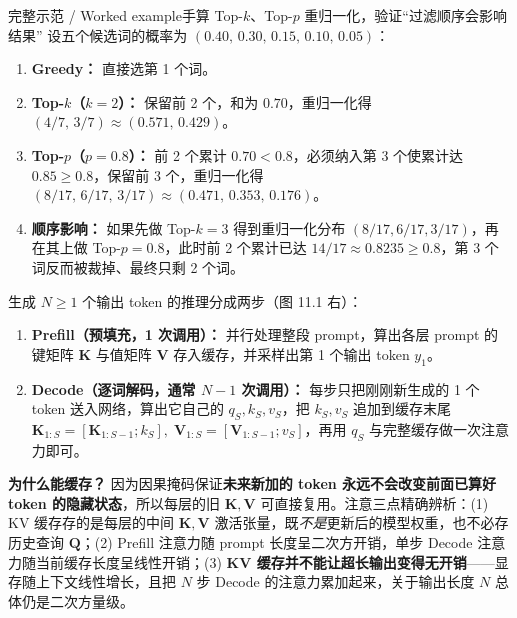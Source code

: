 \begin{StudyBlock}{完整示范 / Worked example}{手算 Top-$k$、Top-$p$ 重归一化，验证“过滤顺序会影响结果”}
设五个候选词的概率为 $(0.40,\, 0.30,\, 0.15,\, 0.10,\, 0.05)$：
\begin{enumerate}
\item \textbf{Greedy：} 直接选第 1 个词。
\item \textbf{Top-$k$（$k=2$）：} 保留前 2 个，和为 $0.70$，重归一化得 $(4/7,\, 3/7) \approx (0.571,\, 0.429)$。
\item \textbf{Top-$p$（$p=0.8$）：} 前 2 个累计 $0.70 < 0.8$，必须纳入第 3 个使累计达 $0.85 \ge 0.8$，保留前 3 个，重归一化得 $(8/17,\, 6/17,\, 3/17) \approx (0.471,\, 0.353,\, 0.176)$。
\item \textbf{顺序影响：} 如果先做 Top-$k=3$ 得到重归一化分布 $(8/17, 6/17, 3/17)$，再在其上做 Top-$p=0.8$，此时前 2 个累计已达 $14/17 \approx 0.8235 \ge 0.8$，第 3 个词反而被裁掉、最终只剩 2 个词。
\end{enumerate}
\end{StudyBlock}


生成 $N\ge 1$ 个输出 token 的推理分成两步（图 11.1 右）：
\begin{enumerate}
\item \textbf{Prefill（预填充，1 次调用）：} 并行处理整段 prompt，算出各层 prompt 的键矩阵 $\mathbf{K}$ 与值矩阵 $\mathbf{V}$ 存入缓存，并采样出第 1 个输出 token $y_1$。
\item \textbf{Decode（逐词解码，通常 $N-1$ 次调用）：} 每步只把刚刚新生成的 1 个 token 送入网络，算出它自己的 $q_S, k_S, v_S$，把 $k_S, v_S$ 追加到缓存末尾 $\mathbf{K}_{1:S}=[\mathbf{K}_{1:S-1}; k_S],\;\mathbf{V}_{1:S}=[\mathbf{V}_{1:S-1}; v_S]$，再用 $q_S$ 与完整缓存做一次注意力即可。
\end{enumerate}
\textbf{为什么能缓存？} 因为因果掩码保证\textbf{未来新加的 token 永远不会改变前面已算好 token 的隐藏状态}，所以每层的旧 $\mathbf{K}, \mathbf{V}$ 可直接复用。注意三点精确辨析：(1) KV 缓存存的是每层的中间 $\mathbf{K}, \mathbf{V}$ 激活张量，既\emph{不是}更新后的模型权重，也不必存历史查询 $\mathbf{Q}$；(2) Prefill 注意力随 prompt 长度呈二次方开销，单步 Decode 注意力随当前缓存长度呈线性开销；(3) \textbf{KV 缓存并不能让超长输出变得无开销}——显存随上下文线性增长，且把 $N$ 步 Decode 的注意力累加起来，关于输出长度 $N$ 总体仍是二次方量级。


